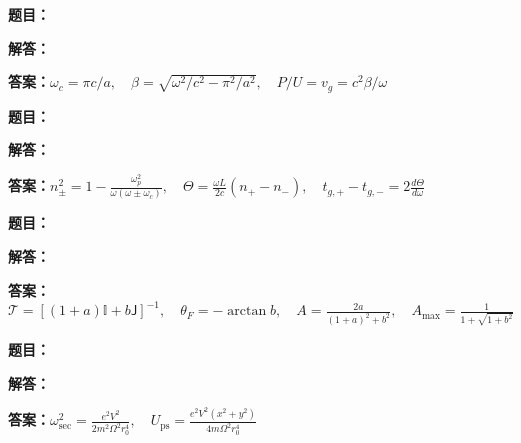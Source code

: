 \documentclass[lang=cn,color=blue,11pt]{elegantbook}
\begin{document}
\par
\noindent\textbf{题目：}
\par\noindent\textbf{解答：}
\par\noindent\textbf{答案：}\(\displaystyle \omega_c=\pi c/a,\quad \beta=\sqrt{\omega^2/c^2-\pi^2/a^2},\quad P/U=v_g=c^2\beta/\omega\)\par
\par\smallskip\noindent\hrulefill\par\medskip
{}\par
\noindent\textbf{题目：}
\par\noindent\textbf{解答：}
\par\noindent\textbf{答案：}\(\displaystyle n_\pm^2=1-\frac{\omega_p^2}{\omega(\omega\pm\omega_c)},\quad \Theta=\frac{\omega L}{2c}(n_+-n_-),\quad t_{g,+}-t_{g,-}=2\frac{d\Theta}{d\omega}\)\par
\par\smallskip\noindent\hrulefill\par\medskip
{}\par
\noindent\textbf{题目：}
\par\noindent\textbf{解答：}
\par\noindent\textbf{答案：}\(\displaystyle \mathcal T=[(1+a)\mathbb I+b\mathsf J]^{-1},\quad \theta_F=-\arctan b,\quad A=\frac{2a}{(1+a)^2+b^2},\quad A_{\max}=\frac{1}{1+\sqrt{1+b^2}}\)\par
\par\smallskip\noindent\hrulefill\par\medskip
{}\par
\noindent\textbf{题目：}
\par\noindent\textbf{解答：}
\par\noindent\textbf{答案：}\(\displaystyle \omega_{\mathrm{sec}}^2=\frac{e^2V^2}{2m^2\Omega^2r_0^4},\quad U_{\mathrm{ps}}=\frac{e^2V^2(x^2+y^2)}{4m\Omega^2r_0^4}\)\par
\end{document}
